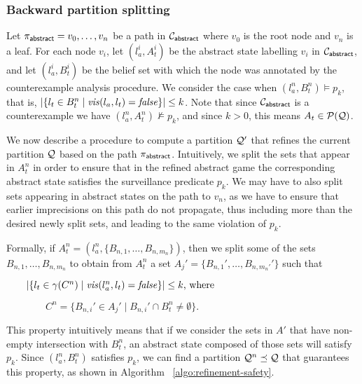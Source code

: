 \subsubsection{Backward partition splitting}
Let $\pi_{\mathsf{abstract}} = v_0,\ldots, v_n$ be a path in $\mathcal{C}_{\mathsf{abstract}}$ where $v_0$ is the root node and $v_n$ is a leaf. For each node $v_i$, let $(l_a^i,A_t^i) $ be the abstract state labelling $v_i$ in $\mathcal{C}_{\mathsf{abstract}}$, and let $(l_a^i,B_t^i)$ be the  belief set with which the node was annotated by the counterexample analysis procedure. We consider the case when $(l_a^n,B_t^n) \models p_k$, that is, $|\{l_t \in B_t^n \mid \mathit{vis}(l_a,l_t) = \mathit{false}\}| \leq k$.
Note that since $\mathcal{C}_{\mathsf{abstract}}$ is a counterexample we have $(l_a^n,A_t^n) \not \models p_k$, and since $k>0$, this means $A_t \in \mathcal{P}(\mathcal{Q})$.


We now describe a procedure to compute a partition $\mathcal{Q}'$ that refines the current partition $\mathcal{Q}$ based on the path $\pi_{\mathsf{abstract}}$. Intuitively, we split the sets that appear in $A_t^n$ in order to ensure that in the refined abstract game the corresponding abstract state satisfies the surveillance predicate $p_k$. We may have to also split sets appearing in abstract states on the path to $v_n$, as we have to ensure that earlier imprecisions on this path do not propagate, thus including more than the desired newly split sets, and leading to the same violation of $p_k$.

Formally, if $A_t^n = (l_a^n,\{B_{n,1},\ldots,B_{n,m_n}\})$, then we split some of the sets $B_{n,1},\ldots,B_{n,m_n}$ to obtain from $A_t^n$ a set $A_j' = \{B_{n,1}',\ldots,B_{n,m_n'}'\}$ such that

$\qquad|\{l_t \in \gamma(C^n) \mid \mathit{vis}(l_a^n,l_t) = \mathit{false}\}| \leq k \text{, where}$

$\qquad\qquad C^n = \{B_{n,i}' \in A_j' \mid B_{n,i}' \cap B_t^n \neq \emptyset\}.$

This property intuitively means that if we consider the sets in $A'$ that have non-empty intersection with $B_t^n$, an abstract state composed of those sets will satisfy $p_k$. Since $(l_a^n,B_t^n)$ satisfies $p_k$, we can find a partition $\mathcal{Q}^n \preceq \mathcal{Q}$ that guarantees this property, as shown in Algorithm ~\ref{algo:refinement-safety}.
 
